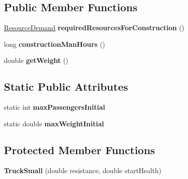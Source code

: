 \subsection*{Public Member Functions}
\begin{DoxyCompactItemize}
\item 
\hyperlink{classuniverse_1_1_resource_demand}{Resource\+Demand} {\bfseries required\+Resources\+For\+Construction} ()\hypertarget{classtools_1_1vehicles_1_1roadgoing_1_1_truck_small_abddc14664b727d4a5a53d3d3a248690e}{}\label{classtools_1_1vehicles_1_1roadgoing_1_1_truck_small_abddc14664b727d4a5a53d3d3a248690e}

\item 
long {\bfseries construction\+Man\+Hours} ()\hypertarget{classtools_1_1vehicles_1_1roadgoing_1_1_truck_small_a1a5656ba0444828dbc5f90802ed0a25e}{}\label{classtools_1_1vehicles_1_1roadgoing_1_1_truck_small_a1a5656ba0444828dbc5f90802ed0a25e}

\item 
double {\bfseries get\+Weight} ()\hypertarget{classtools_1_1vehicles_1_1roadgoing_1_1_truck_small_ad6845f0d6f05c743476a5bf91fc24ef8}{}\label{classtools_1_1vehicles_1_1roadgoing_1_1_truck_small_ad6845f0d6f05c743476a5bf91fc24ef8}

\end{DoxyCompactItemize}
\subsection*{Static Public Attributes}
\begin{DoxyCompactItemize}
\item 
static int {\bfseries max\+Passengers\+Initial}\hypertarget{classtools_1_1vehicles_1_1roadgoing_1_1_truck_small_a75d2a2af9bb23bd8c4ebb0e9face69af}{}\label{classtools_1_1vehicles_1_1roadgoing_1_1_truck_small_a75d2a2af9bb23bd8c4ebb0e9face69af}

\item 
static double {\bfseries max\+Weight\+Initial}\hypertarget{classtools_1_1vehicles_1_1roadgoing_1_1_truck_small_a925d11d512296d1e4f276f044225dd29}{}\label{classtools_1_1vehicles_1_1roadgoing_1_1_truck_small_a925d11d512296d1e4f276f044225dd29}

\end{DoxyCompactItemize}
\subsection*{Protected Member Functions}
\begin{DoxyCompactItemize}
\item 
{\bfseries Truck\+Small} (double resistance, double start\+Health)\hypertarget{classtools_1_1vehicles_1_1roadgoing_1_1_truck_small_a0ddf928558864c3320579283d1e0150e}{}\label{classtools_1_1vehicles_1_1roadgoing_1_1_truck_small_a0ddf928558864c3320579283d1e0150e}

\end{DoxyCompactItemize}
